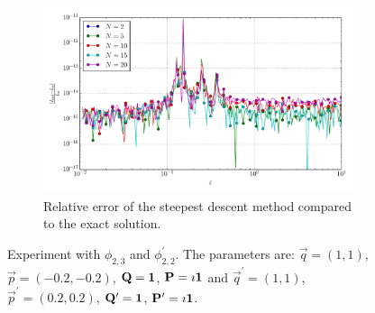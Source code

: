 \documentclass[a4paper,10pt]{article}
\begin{document}
\begin{figure}[ht!]
\begin{subfigure}[t]{0.5\linewidth}
    \includegraphics[width=\linewidth]{./plots/tp_2d_conv_eps_(2,3)_(2,2)_err_rel_nsd.pdf}
    \caption{Relative error of the steepest descent method compared to the exact solution.}
    \label{fig:tp_2d_conv_eps_23_22_err_rel_nsd}
  \end{subfigure}
  \label{fig:tp_2d_conv_eps_23_22}
  \caption{Experiment with $\phi_{2,3}$ and $\phi_{2,2}^{\prime}$.
  The parameters are:
  $\vec{q} = (1, 1)$,
  $\vec{p} = (-0.2, -0.2)$,
  $\mathbf{Q} = \mathbf{1}$,
  $\mathbf{P} = \imath \mathbf{1}$
  and
  $\vec{q}^\prime = (1, 1)$,
  $\vec{p}^\prime = (0.2, 0.2)$,
  $\mathbf{Q}^\prime = \mathbf{1}$,
  $\mathbf{P}^\prime = \imath \mathbf{1}$.}
\end{figure}
\end{document}
